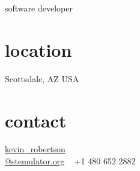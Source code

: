\documentclass[]{cv}
\begin{document}
       {software developer}

\begin{aside}
    \section{location}
        Scottsdale, AZ
        USA
    \section{contact}
        \href{mailto:kevin_robertson@stemulator.org}{kevin\_robertson\\@stemulator.org}
        ~
        +1 480 652 2882
\end{aside}





\end{document}
